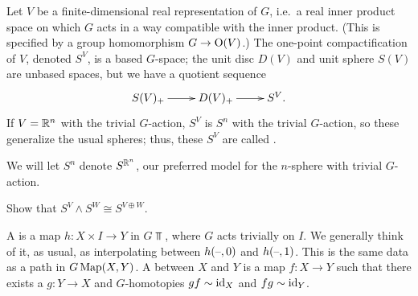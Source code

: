 \begin{exm}
Let $V$ be a finite-dimensional real representation of $G$, i.e.\ a real inner product space on which $G$ acts in a
way compatible with the inner product. (This is specified by a group homomorphism $G\to\mathrm O(V)$.) The one-point
compactification of $V$, denoted $S^V$, is a based $G$-space; the unit disc $D(V)$ and unit sphere $S(V)$ are
unbased spaces, but we have a quotient sequence
\[\xymatrix{
	S(V)_+\ar[r] & D(V)_+\ar[r] & S^V.
}\]
If $V = \mathbb R^n$ with the trivial $G$-action, $S^V$ is $S^n$ with the trivial $G$-action, so these generalize the
usual spheres; thus, these $S^V$ are called .
\end{exm}
We will let $S^n$ denote $S^{\mathbb R^n}$, our preferred model for the $n$-sphere with trivial $G$-action.
\begin{ex}
Show that $S^V\wedge S^W\cong S^{V\oplus W}$.
\end{ex}
\begin{defn}
A  is a map $h\colon X\times I\to Y$ in $G\Top$, where $G$ acts
trivially on $I$. We generally think of it, as usual, as interpolating between $h(\text{--}, 0)$ and $h(\text{--}, 1)$. This is
the same data as a path in $G\operatorname{Map}(X,Y)$. A  between $X$ and $Y$ is a map $f\colon X\to Y$ such that there exists a $g\colon Y\to X$ and
$G$-homotopies $gf\sim \mathrm{id}_X$ and $fg\sim\mathrm{id}_Y$.
\end{defn}
